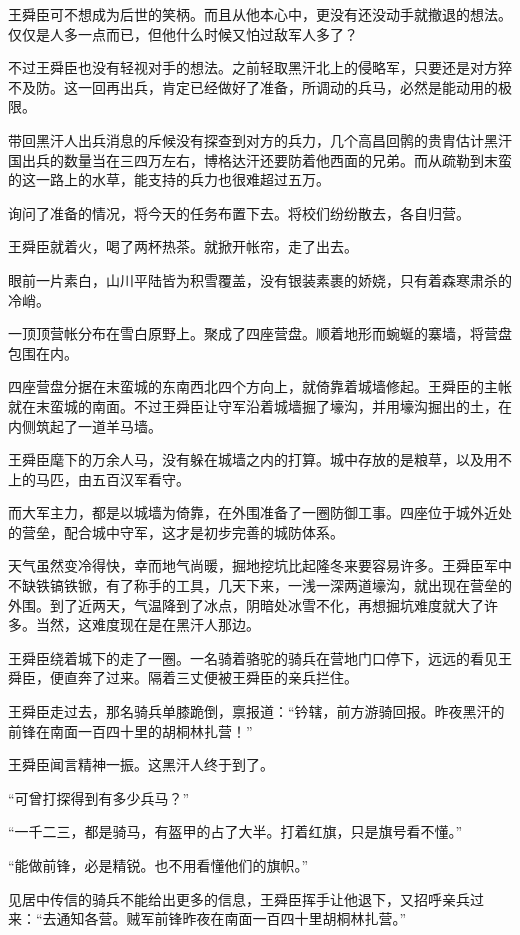 王舜臣可不想成为后世的笑柄。而且从他本心中，更没有还没动手就撤退的想法。仅仅是人多一点而已，但他什么时候又怕过敌军人多了？

不过王舜臣也没有轻视对手的想法。之前轻取黑汗北上的侵略军，只要还是对方猝不及防。这一回再出兵，肯定已经做好了准备，所调动的兵马，必然是能动用的极限。

带回黑汗人出兵消息的斥候没有探查到对方的兵力，几个高昌回鹘的贵胄估计黑汗国出兵的数量当在三四万左右，博格达汗还要防着他西面的兄弟。而从疏勒到末蛮的这一路上的水草，能支持的兵力也很难超过五万。

询问了准备的情况，将今天的任务布置下去。将校们纷纷散去，各自归营。

王舜臣就着火，喝了两杯热茶。就掀开帐帘，走了出去。

眼前一片素白，山川平陆皆为积雪覆盖，没有银装素裹的娇娆，只有着森寒肃杀的冷峭。

一顶顶营帐分布在雪白原野上。聚成了四座营盘。顺着地形而蜿蜒的寨墙，将营盘包围在内。

四座营盘分据在末蛮城的东南西北四个方向上，就倚靠着城墙修起。王舜臣的主帐就在末蛮城的南面。不过王舜臣让守军沿着城墙掘了壕沟，并用壕沟掘出的土，在内侧筑起了一道羊马墙。

王舜臣麾下的万余人马，没有躲在城墙之内的打算。城中存放的是粮草，以及用不上的马匹，由五百汉军看守。

而大军主力，都是以城墙为倚靠，在外围准备了一圈防御工事。四座位于城外近处的营垒，配合城中守军，这才是初步完善的城防体系。

天气虽然变冷得快，幸而地气尚暖，掘地挖坑比起隆冬来要容易许多。王舜臣军中不缺铁镐铁锨，有了称手的工具，几天下来，一浅一深两道壕沟，就出现在营垒的外围。到了近两天，气温降到了冰点，阴暗处冰雪不化，再想掘坑难度就大了许多。当然，这难度现在是在黑汗人那边。

王舜臣绕着城下的走了一圈。一名骑着骆驼的骑兵在营地门口停下，远远的看见王舜臣，便直奔了过来。隔着三丈便被王舜臣的亲兵拦住。

王舜臣走过去，那名骑兵单膝跪倒，禀报道：“钤辖，前方游骑回报。昨夜黑汗的前锋在南面一百四十里的胡桐林扎营！”

王舜臣闻言精神一振。这黑汗人终于到了。

“可曾打探得到有多少兵马？”

“一千二三，都是骑马，有盔甲的占了大半。打着红旗，只是旗号看不懂。”

“能做前锋，必是精锐。也不用看懂他们的旗帜。”

见居中传信的骑兵不能给出更多的信息，王舜臣挥手让他退下，又招呼亲兵过来：“去通知各营。贼军前锋昨夜在南面一百四十里胡桐林扎营。”

